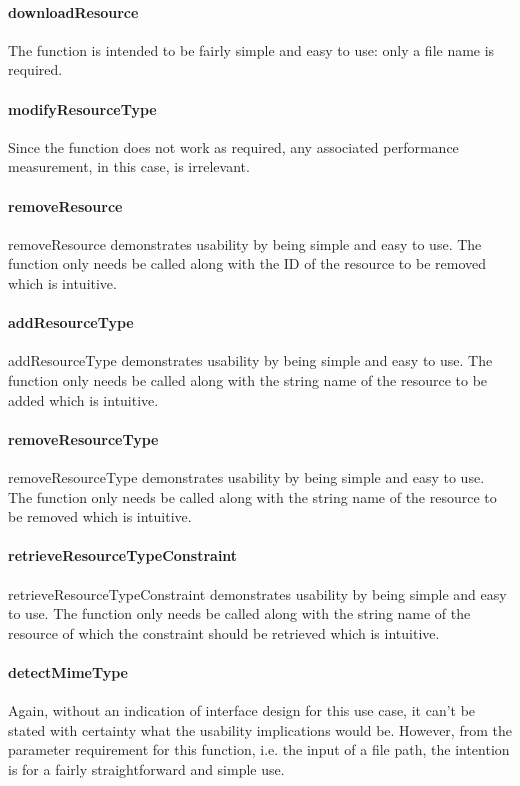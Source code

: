 \documentclass[a4paper]{article}
\begin{document}
\paragraph{downloadResource}
 The function is intended to be fairly simple and easy to use: only a file name is required.

\paragraph{modifyResourceType}
Since the function does not work as required, any associated performance measurement, in this case, is irrelevant. 

\paragraph{removeResource}
removeResource demonstrates usability by being simple and easy to use. The function only needs be called along with the ID of the resource to be removed which is intuitive.

\paragraph{addResourceType}
addResourceType demonstrates usability by being simple and easy to use. The function only needs be called along with the string name of the resource to be added which is intuitive.

\paragraph{removeResourceType}
removeResourceType demonstrates usability by being simple and easy to use. The function only needs be called along with the string name of the resource to be removed which is intuitive.

\paragraph{retrieveResourceTypeConstraint}
retrieveResourceTypeConstraint demonstrates usability by being simple and easy to use. The function only needs be called along with the string name of the resource of which the constraint should be retrieved which is intuitive.

\paragraph{detectMimeType}
Again, without an indication of interface design for this use case, it can’t be stated with certainty what the usability implications would be. However, from the parameter requirement for this function, i.e. the input of a file path, the intention is for a fairly straightforward and simple use.
\end{document}
